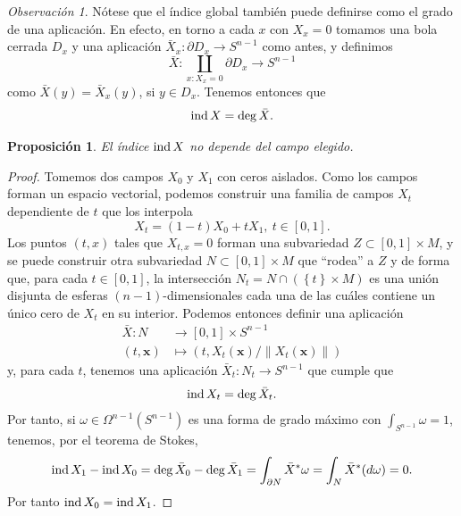 \documentclass[11pt,a4paper]{amsbook}
\newtheorem{prop}[subsection]{Proposición}
\theoremstyle{remark} \newtheorem{rmk}[subsection]{Observación}
\theoremstyle{definition} \newtheorem{defn}[subsection]{Definición}
\theoremstyle{definition} \newtheorem{ex}[subsection]{Ejemplo}
\theoremstyle{definition} \newtheorem{ej}[subsection]{Ejercicio}
\begin{document}
\begin{rmk}
Nótese que el índice global también puede definirse como el grado de una aplicación. En efecto, en torno a cada $x$ con $X_x=0$ tomamos una bola cerrada $D_x$ y una aplicación $\bar{X}_x:\partial D_x \rightarrow S^{n-1}$ como antes, y definimos
\begin{equation*}
\bar{X}: \coprod_{x: X_x=0} \partial D_x \rightarrow S^{n-1}
\end{equation*}
como $\bar{X}(y) = \bar{X}_x(y)$, si $y\in D_x$. Tenemos entonces que
\begin{equation*}
\operatorname{ind} X = \deg \bar{X}.
\end{equation*}
\end{rmk}


\begin{prop}
El índice $\operatorname{ind} X$ no depende del campo elegido.
\end{prop}

\begin{proof}
Tomemos dos campos $X_0$ y $X_1$ con ceros aislados. Como los campos forman un espacio vectorial, podemos construir una familia de campos $X_t$ dependiente de $t$ que los interpola
\begin{equation*}
X_t = (1-t) X_0 + t X_1,\ t\in [0,1].
\end{equation*}
Los puntos $(t,x)$ tales que $X_{t,x} = 0$ forman una subvariedad $Z \subset [0,1] \times M$, y se puede construir otra subvariedad $N \subset [0,1] \times M$ que ``rodea'' a $Z$ y de forma que, para cada $t \in [0,1]$, la intersección $N_t=N \cap (\left\{ t \right\} \times M)$ es una unión disjunta de esferas $(n-1)$-dimensionales cada una de las cuáles contiene un único cero de $X_t$ en su interior. Podemos entonces definir una aplicación
\begin{align*}
  \bar{X}: N & \longrightarrow [0,1]\times S^{n-1} \\
  (t,\bm{x})  & \longmapsto (t, X_t(\bm{x})/\lVert X_t(\bm{x})\rVert)
\end{align*}
y, para cada $t$, tenemos una aplicación $\bar{X}_t:N_t \rightarrow S^{n-1}$
que cumple que
\begin{equation*}
\operatorname{ind} X_t = \deg \bar{X}_t.
\end{equation*}
Por tanto, si $\omega \in \Omega^{n-1}(S^{n-1})$ es una forma de grado máximo con $\int_{S^{n-1}}\omega = 1$, tenemos, por el teorema de Stokes,
\begin{equation*}
\operatorname{ind} X_1 - \operatorname{ind} X_0 = \deg \bar{X}_0 - \deg \bar{X}_1 = \int_{\partial N} \bar{X}^* \omega = \int_N \bar{X}^* (d\omega) = 0.
\end{equation*}
Por tanto $\operatorname{ind} X_0 = \operatorname{ind} X_1$.
\end{proof}
\end{document}
